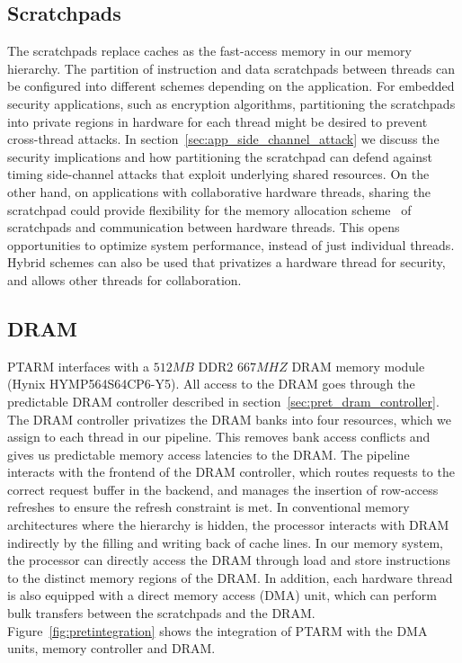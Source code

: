 \subsection{Scratchpads}
The scratchpads replace caches as the fast-access memory in our memory hierarchy.   
The partition of instruction and data scratchpads between threads can be configured into different schemes depending on the application.   
For embedded security applications, such as encryption algorithms, partitioning the scratchpads into private regions in hardware for each thread might be desired to prevent cross-thread attacks.
In section~\ref{sec:app_side_channel_attack} we discuss the security implications and how partitioning the scratchpad can defend against timing side-channel attacks that exploit underlying shared resources.
On the other hand, on applications with collaborative hardware threads, sharing the scratchpad could provide flexibility for the memory allocation scheme~\cite{Suhendra:2010:SAC:1734206.1734210} of scratchpads and communication between hardware threads.
This opens opportunities to optimize system performance, instead of just individual threads.  
Hybrid schemes can also be used that privatizes a hardware thread for security, and allows other threads for collaboration.  

\subsection{DRAM}
\label{sec:ptarm_dram_integration}
PTARM interfaces with a $512MB$ DDR2 $667MHZ$ DRAM memory module (Hynix HYMP564S64CP6-Y5). 
All access to the DRAM goes through the predictable DRAM controller described in section~\ref{sec:pret_dram_controller}.
The DRAM controller privatizes the DRAM banks into four resources, which we assign to each thread in our pipeline. 
This removes bank access conflicts and gives us predictable memory access latencies to the DRAM.
The pipeline interacts with the frontend of the DRAM controller, which routes requests to the correct request buffer in the backend, and manages the insertion of row-access refreshes to ensure the refresh constraint is met.   
In conventional memory architectures where the hierarchy is hidden, the processor interacts with DRAM indirectly by the filling and writing back of cache lines.
In our memory system, the processor can directly access the DRAM through load and store instructions to the distinct memory regions of the DRAM.
In addition, each hardware thread is also equipped with a direct memory access (DMA) unit, which can perform bulk transfers between the scratchpads and the DRAM.
Figure~\ref{fig:pretintegration} shows the integration of PTARM with the DMA units, memory controller and DRAM.  


